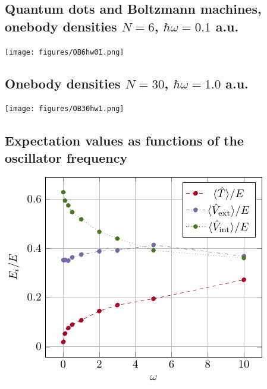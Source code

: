 \documentclass[%
oneside,                 %
final,                   %
10pt]{article}
\begin{document}
\subsection{Quantum dots and Boltzmann machines, onebody densities $N=6$, $\hbar\omega=0.1$ a.u.}

\begin{block}{}

\vspace{6mm}

\centerline{\texttt{[image: figures/OB6hw01.png]}}

\vspace{6mm}

\end{block}

\subsection{Onebody densities $N=30$, $\hbar\omega=1.0$ a.u.}
\begin{block}{}

\vspace{6mm}

\centerline{\texttt{[image: figures/OB30hw1.png]}}

\vspace{6mm}

\end{block}

\subsection{Expectation values as functions of the oscillator frequency}

\begin{block}{}

\vspace{6mm}

\centerline{\includegraphics[width=0.9\linewidth]{figures/virialtheorem.pdf}}

\vspace{6mm}

\end{block}
\end{document}
